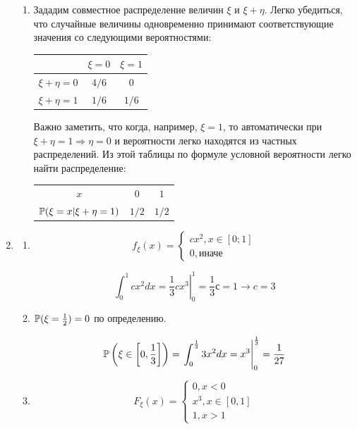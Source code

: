 \begin{enumerate}
\begin{enumerate}
\item
Зададим совместное распределение величин $\xi$ и $\xi + \eta$. Легко убедиться,
что случайные величины одновременно принимают соответствующие значения со следующими
вероятностями:

\begin{center}
	\begin{tabular}{ccc}
		\toprule
		& $\xi = 0$ & $\xi = 1$ \\ \midrule
		$\xi + \eta = 0$ & $4/6$  & $0$ \\
		$\xi + \eta = 1$ & $1/6$  & $1/6$ \\
		\bottomrule
	\end{tabular}
\end{center}

Важно заметить, что когда, например, $\xi = 1$, то автоматически при
$\xi + \eta  = 1 \Rightarrow \eta = 0$ и вероятности легко находятся из частных распределений.
Из этой таблицы по формуле условной вероятности легко найти распределение:


\begin{center}
\begin{tabular}{ccc}
\toprule
$x$ & $0$ & $1$ \\
$\P(\xi = x | \xi + \eta = 1)$ & $1/2$ & $1/2$ \\ 
\bottomrule
\end{tabular}
\end{center}
\end{enumerate}

\item
\begin{enumerate}
\item
\[
f_\xi(x) =
\begin{cases}
cx^2 , x \in [0;1] \\
0 , \text{иначе}
\end{cases}
\]

\[
\int_{0}^{1}cx^2 dx= \left. \frac{1}{3}c x^3 \right|_0^1 = \frac{1}{3} с = 1 \to c = 3
\]

\item
$\P(\xi = \frac{1}{2}) = 0$ по определению.

\[
\P\left(\xi \in \left[0, \frac{1}{3}\right]\right) = \left. \int_{0}^{\frac{1}{3}} 3x^2 dx = x^3 \right|_0^{\frac{1}{3}}  = \frac{1}{27}
\]
\item
\[
F_\xi(x) =
\begin{cases}
0, x < 0\\
x^3, x \in [0, 1]\\
1, x > 1
\end{cases}
\]


\end{enumerate}
\end{enumerate}
